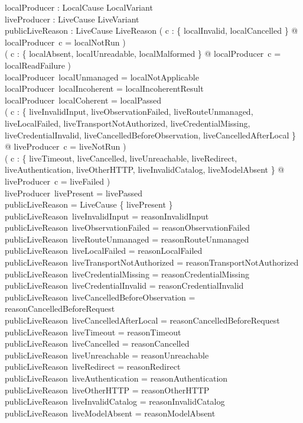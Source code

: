 \documentclass{article}
\begin{document}
\begin{axdef}
	localProducer : LocalCause \fun LocalVariant \\
	liveProducer : LiveCause \fun LiveVariant \\
	publicLiveReason : LiveCause \pfun LiveReason
	\where
	( \forall c : \{ localInvalid, localCancelled \} @
	localProducer~c = localNotRun ) \\
	( \forall c : \{ localAbsent, localUnreadable, localMalformed \} @
	localProducer~c = localReadFailure ) \\
	localProducer~localUnmanaged = localNotApplicable \\
	localProducer~localIncoherent = localIncoherentResult \\
	localProducer~localCoherent = localPassed \\
	( \forall c : \{ liveInvalidInput, liveObservationFailed,
	liveRouteUnmanaged, liveLocalFailed, liveTransportNotAuthorized,
	liveCredentialMissing, liveCredentialInvalid,
	liveCancelledBeforeObservation, liveCancelledAfterLocal \} @
	liveProducer~c = liveNotRun ) \\
	( \forall c : \{ liveTimeout, liveCancelled, liveUnreachable,
	liveRedirect, liveAuthentication, liveOtherHTTP, liveInvalidCatalog,
	liveModelAbsent \} @ liveProducer~c = liveFailed ) \\
	liveProducer~livePresent = livePassed \\
	\dom publicLiveReason = LiveCause \setminus \{ livePresent \} \\
	publicLiveReason~liveInvalidInput = reasonInvalidInput \\
	publicLiveReason~liveObservationFailed = reasonObservationFailed \\
	publicLiveReason~liveRouteUnmanaged = reasonRouteUnmanaged \\
	publicLiveReason~liveLocalFailed = reasonLocalFailed \\
	publicLiveReason~liveTransportNotAuthorized = reasonTransportNotAuthorized \\
	publicLiveReason~liveCredentialMissing = reasonCredentialMissing \\
	publicLiveReason~liveCredentialInvalid = reasonCredentialInvalid \\
	publicLiveReason~liveCancelledBeforeObservation = reasonCancelledBeforeRequest \\
	publicLiveReason~liveCancelledAfterLocal = reasonCancelledBeforeRequest \\
	publicLiveReason~liveTimeout = reasonTimeout \\
	publicLiveReason~liveCancelled = reasonCancelled \\
	publicLiveReason~liveUnreachable = reasonUnreachable \\
	publicLiveReason~liveRedirect = reasonRedirect \\
	publicLiveReason~liveAuthentication = reasonAuthentication \\
	publicLiveReason~liveOtherHTTP = reasonOtherHTTP \\
	publicLiveReason~liveInvalidCatalog = reasonInvalidCatalog \\
	publicLiveReason~liveModelAbsent = reasonModelAbsent
\end{axdef}
\end{document}
